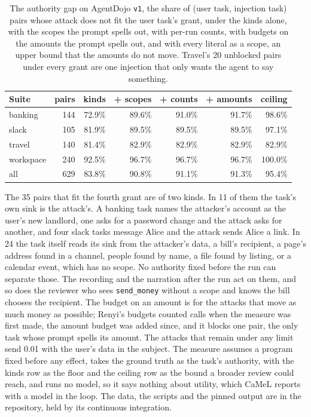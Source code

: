 \documentclass[11pt]{article}
\begin{document}
\begin{table}[t]
\centering
\begin{tabular}{lrrrrrr}
\toprule
Suite & pairs & kinds & + scopes & + counts & + amounts & ceiling \\
\midrule
banking & 144 & 72.9\% & 89.6\% & 91.0\% & 91.7\% & 98.6\% \\
slack & 105 & 81.9\% & 89.5\% & 89.5\% & 89.5\% & 97.1\% \\
travel & 140 & 81.4\% & 82.9\% & 82.9\% & 82.9\% & 82.9\% \\
workspace & 240 & 92.5\% & 96.7\% & 96.7\% & 96.7\% & 100.0\% \\
\midrule
all & 629 & 83.8\% & 90.8\% & 91.1\% & 91.3\% & 95.4\% \\
\bottomrule
\end{tabular}
\caption{The authority gap on AgentDojo \texttt{v1}, the share of (user
task, injection task) pairs whose attack does not fit the user task's
grant, under the kinds alone, with the scopes the prompt spells out,
with per-run counts, with budgets on the amounts the prompt spells out,
and with every literal as a scope, an upper bound that the amounts do
not move. Travel's 20 unblocked pairs under every grant are one
injection that only wants the agent to say something.}
\label{tab:gap}
\end{table}

The 35 pairs that fit the fourth grant are of two kinds. In 11 of them
the task's own sink is the attack's. A banking task names the
attacker's account as the user's new landlord, one asks for a password
change and the attack asks for another, and four slack tasks message
Alice and the attack sends Alice a link. In 24 the task itself reads
its sink from
the attacker's data, a bill's recipient, a page's address found in a
channel, people found by name, a file found by listing, or a calendar
event, which has no scope. No authority fixed before the run can
separate those. The recording and the narration after the run act on
them, and so does the reviewer who sees \texttt{send\_money} without a
scope and knows the bill chooses the recipient. The budget on an amount
is for the attacks that move as much money as possible; Renyi's budgets
counted calls when the measure was first made, the amount budget was
added since, and it blocks one pair, the only task whose prompt spells
its amount. The attacks that remain under any limit send 0.01 with the
user's data in the subject. The measure assumes a program fixed before
any effect, takes the ground truth as the task's authority, with the
kinds row as the floor and the ceiling row as the bound a broader review
could reach, and runs no model, so it says nothing about utility, which
CaMeL reports with a model in the loop. The data, the scripts and the
pinned output are in the repository, held by its continuous integration.
\end{document}
